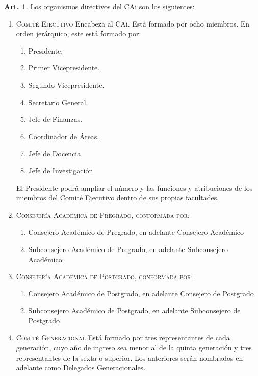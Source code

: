 \documentclass[letterpaper,11pt]{article}
\theoremstyle{definition}%
\newtheorem{art}{Art.} %
\begin{document}
\begin{art}\label{organismosCAi}
	Los organismos directivos del CAi son los siguientes:
	\begin{enumerate}
		\item \label{jerarquia} \textsc{Comité Ejecutivo} Encabeza al CAi. Está formado por ocho miembros. En orden jerárquico, este está formado por:
		      \begin{enumerate}
			      \item Presidente.
			      \item Primer Vicepresidente.
			      \item Segundo Vicepresidente.
			      \item Secretario General.
			      \item Jefe de Finanzas.
			      \item Coordinador de Áreas.
			      \item Jefe de Docencia
			      \item Jefe de Investigación
		      \end{enumerate}
		      El Presidente podrá ampliar el número y las funciones y atribuciones de los miembros del Comité Ejecutivo dentro de sus propias facultades.

		\item \textsc{Consejería Académica de Pregrado, conformada por}:
		      \begin{enumerate}
			      \item Consejero Académico de Pregrado, en adelante Consejero Académico
			      \item Subconsejero Académico de Pregrado, en adelante Subconsejero Académico
		      \end{enumerate}

		\item \textsc{Consejería Académica de Postgrado, conformada por}:
		      \begin{enumerate}
			      \item Consejero Académico de Postgrado, en adelante Consejero de Postgrado
			      \item Subconsejero Académico de Postgrado, en adelante Subconsejero de Postgrado
		      \end{enumerate}

		\item \textsc{Comité Generacional} Está formado por tres representantes de cada generación, cuyo año de ingreso sea menor al de la quinta generación y tres representantes de la sexta o superior. Los anteriores serán nombrados en adelante como Delegados Generacionales.


\end{enumerate}
\end{art}
\end{document}
